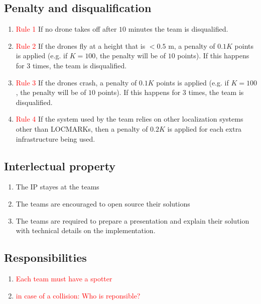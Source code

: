 \subsection{Penalty and disqualification}
\begin{enumerate}
	\item{\textcolor{red}{Rule 1} If no drone takes off after $10$ minutes the team is disqualified.}
	\item{\textcolor{red}{Rule 2} If the drones fly at a height that is $< 0.5$ m, a penalty of $0.1 K$ points is applied (e.g. if $K=100$, the penalty will be of $10$ points). If this happens for $3$ times, the team is disqualified. }
	\item{\textcolor{red}{Rule 3} If the drones crash, a penalty of $0.1 K$ points is applied (e.g. if $K=100$, the penalty will be of $10$ points). If this happens for $3$ times, the team is disqualified. }
	\item{\textcolor{red}{Rule 4}} If the system used by the team relies on other localization systems other than LOCMARKs, then a penalty of $0.2 K$ is applied for each extra infrastructure being used.
\end{enumerate}

\subsection{Interlectual property}
\begin{enumerate}
	\item{The IP stayes at the teams}
	\item{The teams are encouraged to open source their solutions}
	\item{The teams are required to prepare a presentation and explain their solution with technical details on the implementation.}
\end{enumerate}

\subsection{Responsibilities}
\begin{enumerate}
	\item{\textcolor{red}{Each team must have a spotter}}
	\item{\textcolor{red}{in case of a collision: Who is reponsible? }}

\end{enumerate}

